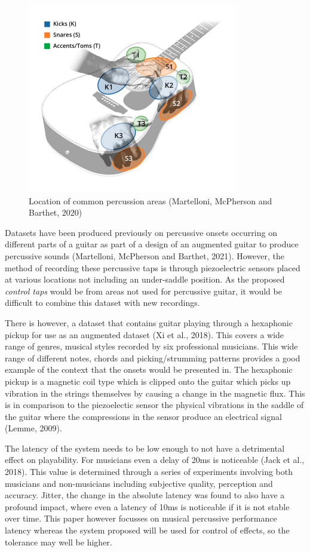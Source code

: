 \documentclass[conference]{IEEEtran}
\begin{document}
\begin{figure}[htbp]
    \centerline{\includegraphics[scale=0.4]{percussion-areas.png}}
    \caption{Location of common percussion areas (Martelloni, McPherson and Barthet, 2020)}
    \label{percussion-areas}
    \end{figure}

Datasets have been produced previously on percussive onsets occurring on different parts of a guitar as part of a design of an augmented guitar to produce percussive sounds (Martelloni, McPherson and Barthet, 2021). However, the method of recording these percussive taps is through piezoelectric sensors placed at various locations not
including an under-saddle position. As the proposed \emph{control taps} would be from areas not used for percussive guitar, it would be difficult to combine this dataset with new recordings.

There is however, a dataset that contains guitar playing through a hexaphonic pickup for use as an augmented dataset (Xi et al., 2018). This covers a wide range of genres, musical styles recorded by six professional musicians.
This wide range of different notes, chords and picking/strumming patterns provides a good example of the context that the onsets would be presented in. The hexaphonic pickup is a magnetic coil type which is clipped onto the guitar which picks
up vibration in the strings themselves by causing a change in the magnetic flux. This is in comparison to the piezoelectic sensor the physical vibrations in the saddle of the guitar where the compressions in the sensor produce an electrical signal (Lemme, 2009).

The latency of the system needs to be low enough to not have a detrimental effect on playability. For musicians even a delay of 20ms is noticeable (Jack et al., 2018). This value is determined through a series of experiments involving both musicians
and non-musicians including subjective quality, perception and accuracy. Jitter, the change in the absolute latency was found to also have a profound impact, where even a latency of 10ms is noticeable if it is not stable over time. This paper however
focusses on musical percussive performance latency whereas the system proposed will be used for control of effects, so the tolerance may well be higher.
\end{document}
